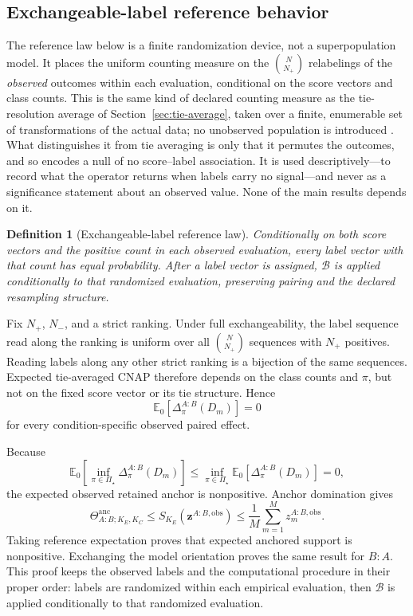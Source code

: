 \documentclass[11pt]{article}
\newcommand{\PSet}{\Pi_\star}
\newcommand{\Boot}{\mathcal{B}}
\newcommand{\E}{\mathbb{E}}
\newcommand{\Thetaanc}{\Theta^{\mathrm{anc}}}
\newtheorem{definition}{Definition}
\theoremstyle{remark}
\begin{document}
\subsection{Exchangeable-label reference behavior}

The reference law below is a finite randomization device, not a superpopulation
model. It places the uniform counting measure on the $\binom{N}{N_+}$
relabelings of the \emph{observed} outcomes within each evaluation, conditional
on the score vectors and class counts. This is the same kind of declared
counting measure as the tie-resolution average of
Section~\ref{sec:tie-average}, taken over a finite, enumerable set of
transformations of the actual data; no unobserved population is introduced
\cite{fisher1935design,pitman1937significance}. What distinguishes it from tie
averaging is only that it permutes the outcomes, and so encodes a null of no
score--label association. It is used descriptively---to record what the operator
returns when labels carry no signal---and never as a significance statement
about an observed value. None of the main results depends on it.

\begin{definition}[Exchangeable-label reference law]
Conditionally on both score vectors and the positive count in each observed
evaluation, every label vector with that count has equal probability. After a
label vector is assigned, $\Boot$ is applied conditionally to that randomized
evaluation, preserving pairing and the declared resampling structure.
\end{definition}

Fix $N_+$, $N_-$, and a strict ranking. Under full exchangeability, the label
sequence read along the ranking is uniform over all $\binom N{N_+}$ sequences
with $N_+$ positives. Reading labels along any other strict ranking is a
bijection of the same sequences. Expected tie-averaged CNAP therefore depends
on the class counts and $\pi$, but not on the fixed score vector or its tie
structure. Hence
\begin{equation}
\E_0[\Delta^{A:B}_\pi(D_m)]=0
\label{eq:reference-cell}
\end{equation}
for every condition-specific observed paired effect.

Because
\[
\E_0\!\left[
\inf_{\pi\in\PSet}\Delta^{A:B}_\pi(D_m)
\right]
\leq
\inf_{\pi\in\PSet}
\E_0[\Delta^{A:B}_\pi(D_m)]
=0,
\]
the expected observed retained anchor is nonpositive. Anchor domination gives
\[
\Thetaanc_{A:B;K_E,K_C}
\leq
S_{K_E}(\mathbf z^{A:B,\mathrm{obs}})
\leq
\frac1M\sum_{m=1}^Mz_m^{A:B,\mathrm{obs}}.
\]
Taking reference expectation proves that expected anchored support is
nonpositive. Exchanging the model orientation proves the same result for
$B:A$. This proof keeps the observed labels and the computational procedure in
their proper order: labels are randomized within each empirical evaluation,
then $\Boot$ is applied conditionally to that randomized evaluation.
\end{document}
